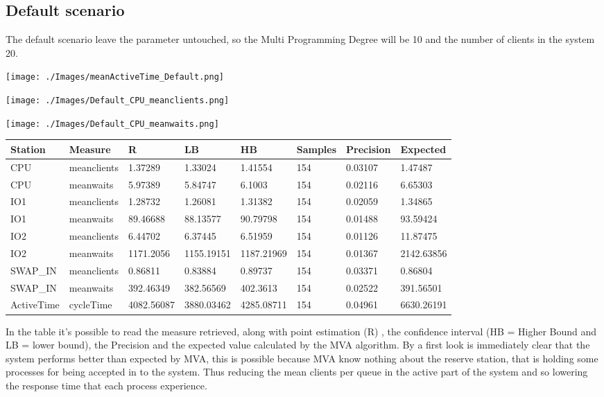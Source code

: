\documentclass[12pt,a4paper]{article}
\begin{document}
\subsection{Default scenario}
The default scenario leave the parameter untouched, so the Multi Programming Degree will be 10 and the number of clients in the system 20.

\texttt{[image: ./Images/meanActiveTime\_Default.png]}

\texttt{[image: ./Images/Default\_CPU\_meanclients.png]}

\texttt{[image: ./Images/Default\_CPU\_meanwaits.png]}


\begin{table}[!ht]
    \centering
    \begin{tabular}{|l|l|l|l|l|l|l|l|}
    \hline
        Station & Measure & R & LB & HB & Samples & Precision & Expected \\ \hline
        CPU & meanclients & 1.37289 & 1.33024 & 1.41554 & 154 & 0.03107 & 1.47487 \\ \hline
        CPU & meanwaits & 5.97389 & 5.84747 & 6.1003 & 154 & 0.02116 & 6.65303 \\ \hline
        IO1 & meanclients & 1.28732 & 1.26081 & 1.31382 & 154 & 0.02059 & 1.34865 \\ \hline
        IO1 & meanwaits & 89.46688 & 88.13577 & 90.79798 & 154 & 0.01488 & 93.59424 \\ \hline
        IO2 & meanclients & 6.44702 & 6.37445 & 6.51959 & 154 & 0.01126 & 11.87475 \\ \hline
        IO2 & meanwaits & 1171.2056 & 1155.19151 & 1187.21969 & 154 & 0.01367 & 2142.63856 \\ \hline
        SWAP\_IN & meanclients & 0.86811 & 0.83884 & 0.89737 & 154 & 0.03371 & 0.86804 \\ \hline
        SWAP\_IN & meanwaits & 392.46349 & 382.56569 & 402.3613 & 154 & 0.02522 & 391.56501 \\ \hline
        ActiveTime & cycleTime & 4082.56087 & 3880.03462 & 4285.08711 & 154 & 0.04961 & 6630.26191 \\ \hline
    \end{tabular}
\end{table}

In the table it's possible to read the measure retrieved, along with point estimation (R) , the confidence interval (HB = Higher Bound and LB = lower bound), the Precision and the expected value calculated by the MVA algorithm. By a first look is immediately clear that the system performs better than expected by MVA, this is possible because MVA know nothing about the reserve station, that is holding some processes for being accepted in to the system. Thus reducing the mean clients per queue in the active part of the system and so lowering the response time that each process experience.
\end{document}

